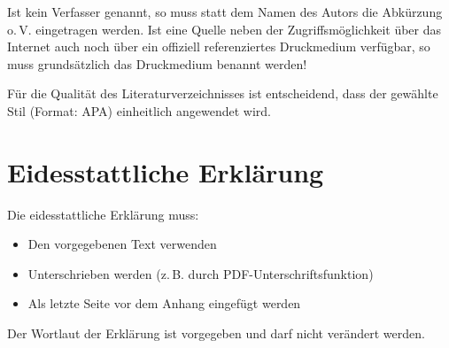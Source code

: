 Ist kein Verfasser genannt, so muss statt dem Namen des Autors die Abkürzung o.\,V. eingetragen werden. Ist eine Quelle neben der Zugriffsmöglichkeit über das Internet auch noch über ein offiziell referenziertes Druckmedium verfügbar, so muss grundsätzlich das Druckmedium benannt werden!

Für die Qualität des Literaturverzeichnisses ist entscheidend, dass der gewählte Stil (Format: APA) einheitlich angewendet wird.

\section{Eidesstattliche Erklärung}
\label{sec:eidesstattliche_erklaerung}

Die eidesstattliche Erklärung muss:
\begin{itemize}
	\item Den vorgegebenen Text verwenden
	\item Unterschrieben werden (z.\,B. durch PDF-Unterschriftsfunktion)
	\item Als letzte Seite vor dem Anhang eingefügt werden
\end{itemize}

Der Wortlaut der Erklärung ist vorgegeben und darf nicht verändert werden.


